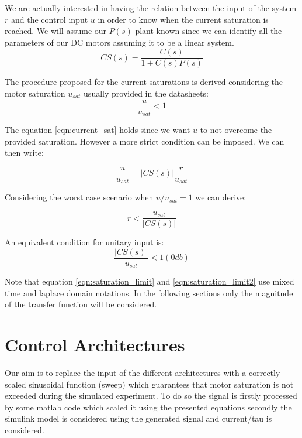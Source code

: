 \documentclass[a4paper,11pt]{article}
\begin{document}
\noindent We are actually interested in having the relation between the input of the system $r$ and the control input $u$ in order to know when the current saturation is reached. We will assume our $P(s)$ plant known since we can identify all the parameters of our DC motors assuming it to be a linear system.
\begin{equation}
  CS(s) = \frac{C(s)}{1+C(s)P(s)}
\end{equation}

\noindent The procedure proposed for the current saturations is derived considering the motor saturation $u_{sat}$ usually provided in the datasheets:
\begin{equation}
  \frac{u}{u_{sat}} < 1
  \label{eqn:current_sat}
\end{equation}

\noindent The equation \eqref{eqn:current_sat} holds since we want $u$ to not overcome the provided saturation. However a more strict condition can be imposed. We can then write:

\begin{equation}
  \frac{u}{u_{sat}} = |CS(s)| \frac{r}{u_{sat}}
\end{equation}

\noindent Considering the worst case scenario when $u/u_{sat}=1$ we can derive:

\begin{equation}
  r < \frac{u_{sat}}{|CS(s)|}
  \label{eqn:saturation_limit}
\end{equation}

\noindent An equivalent condition for unitary input is:
\begin{equation}
  \frac{|CS(s)|}{u_{sat}} < 1 (0db)
  \label{eqn:saturation_limit2}
\end{equation}

\noindent Note that equation \eqref{eqn:saturation_limit} and \eqref{eqn:saturation_limit2} use mixed time and laplace domain notations. In the following sections only the magnitude of the transfer function will be considered. 

\newpage
\section{Control Architectures}

Our aim is to replace the input of the different architectures with a correctly scaled sinusoidal function (sweep) which guarantees that motor saturation is not exceeded during the simulated experiment. To do so the signal is firstly processed by some matlab code which scaled it using the presented equations secondly the simulink model is considered using the generated signal and current/tau is considered. 
\bigskip
\end{document}
